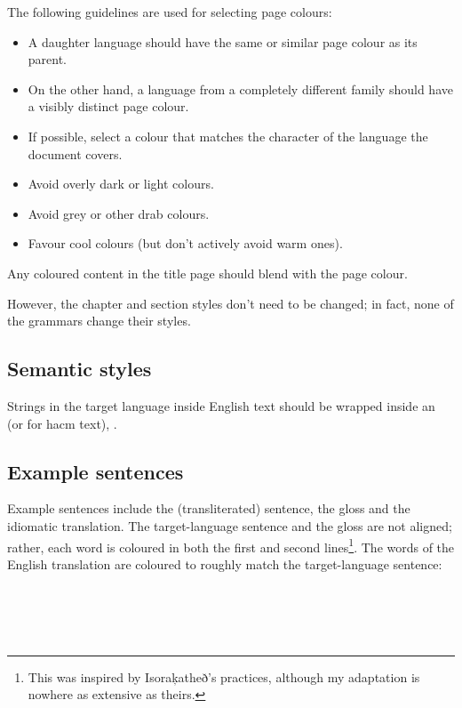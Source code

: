 \documentclass{book}
\begin{document}
The following guidelines are used for selecting page colours:

\begin{itemize}
  \item A daughter language should have the same or similar page colour as its parent.
  \item On the other hand, a language from a completely different family should have a visibly distinct page colour.
  \item If possible, select a colour that matches the character of the language the document covers.
  \item Avoid overly dark or light colours.
  \item Avoid grey or other drab colours.
  \item Favour cool colours (but don't actively avoid warm ones).
\end{itemize}

Any coloured content in the title page should blend with the page colour.

However, the chapter and section styles don't need to be changed; in fact, none of the grammars change their styles.

\subsection{Semantic styles}

Strings in the target language inside English text should be wrapped inside an \texttt{} (or \texttt{} for hacm text), .

\subsection{Example sentences}

Example sentences include the (transliterated) sentence, the gloss and the idiomatic translation. The target-language sentence and the gloss are not aligned; rather, each word is coloured in both the first and second lines\footnote{This was inspired by Isoraķatheð's practices, although my adaptation is nowhere as extensive as theirs.}. The words of the English translation are coloured to roughly match the target-language sentence: \\
~\\
 \\
     \\
     \\
\end{document}
